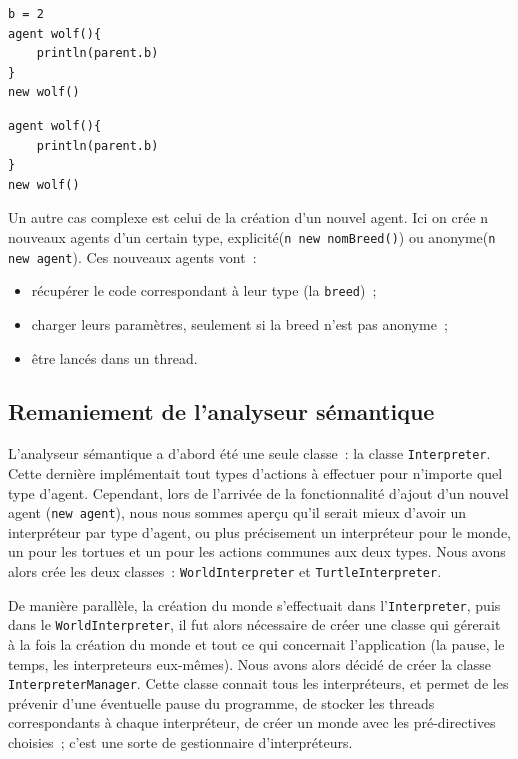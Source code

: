 \begin{lstlisting}[label=affect-parent,caption=Affectation d'une variable héritée]
b = 2
agent wolf(){
	println(parent.b)
}
new wolf()
\end{lstlisting}
\begin{lstlisting}[label=non-affect-parent,caption=Erreur d'affectation d'une variable héritée]
agent wolf(){
	println(parent.b)
}
new wolf()
\end{lstlisting}

Un autre cas complexe est celui de la création d'un nouvel agent. Ici on crée n nouveaux agents d'un certain type, explicité(\verb|n new nomBreed()|) ou anonyme(\verb|n new agent|). Ces nouveaux agents vont~:
\begin{itemize}
\item récupérer le code correspondant à leur type (la \verb|breed|)~;
\item charger leurs paramètres, seulement si la breed n'est pas anonyme~;
\item être lancés dans un thread.
\end{itemize}


\subsection{Remaniement de l'analyseur sémantique}
\label{remaniementInterpreter}

L'analyseur sémantique a d'abord été une seule classe~: la classe \verb|Interpreter|.
Cette dernière implémentait tout types d'actions à effectuer pour n'importe quel type d'agent.
Cependant, lors de l'arrivée de la fonctionnalité d'ajout d'un nouvel agent (\verb|new agent|), nous nous sommes aperçu qu'il serait mieux d'avoir un interpréteur par type d'agent, ou plus précisement un interpréteur pour le monde, un pour les tortues et un pour les actions communes aux deux types.
Nous avons alors crée les deux classes~: \verb|WorldInterpreter| et \verb|TurtleInterpreter|.

De manière parallèle, la création du monde s'effectuait dans l'\verb|Interpreter|, puis dans le \verb|WorldInterpreter|, il fut alors nécessaire de créer une classe qui gérerait à la fois la création du monde et tout ce qui concernait l'application (la pause, le temps, les interpreteurs eux-mêmes). Nous avons alors décidé de créer la classe \verb|InterpreterManager|.
Cette classe connait tous les interpréteurs, et permet de les prévenir d'une éventuelle pause du programme, de stocker les threads correspondants à chaque interpréteur, de créer un monde avec les pré-directives choisies~; c'est une sorte de gestionnaire d'interpréteurs.
